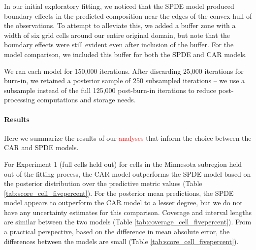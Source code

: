 \documentclass[10pt,letterpaper]{article}
\begin{document}
In our initial exploratory fitting, we noticed that the SPDE model
produced boundary effects in the predicted composition near the edges
of the convex hull of the observations. To attempt to alleviate this,
we added a buffer zone with a width of six grid cells around our entire
original domain, but note that the boundary effects were still evident
even after inclusion of the buffer. For the model comparison, we included
this buffer for both the SPDE and CAR models. 

We ran each model for 150,000 iterations. After discarding 25,000
iterations for burn-in, we retained a posterior sample of 250 subsampled
iterations -- we use a subsample instead of the full 125,000 post-burn-in
iterations to reduce post-processing computations and storage needs. 



\paragraph*{Results}

Here we summarize the results of our \textcolor{red}{analyses} that inform the choice
between the CAR and SPDE models. 

For Experiment 1 (full cells held out) for cells in the Minnesota
subregion held out of the fitting process, the CAR model outperforms
the SPDE model based on the posterior distribution over the predictive
metric values (Table \ref{tab:score_cell_fivepercent}). For the posterior
mean predictions, the SPDE model appears to outperform the CAR model
to a lesser degree, but we do not have any uncertainty estimates for
this comparison. Coverage and interval lengths are similar between
the two models (Table \ref{tab:coverage_cell_fivepercent}). From
a practical perspective, based on the difference in mean absolute
error, the differences between the models are small (Table \ref{tab:score_cell_fivepercent}).
\end{document}

